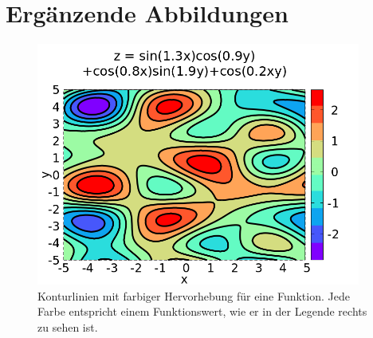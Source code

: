 \chapter{Ergänzende Abbildungen}

\begin{figure}[H]
    \label{fig:ContourComplexFun}
    \centering
    \includegraphics[width=0.95\textwidth]{./gnuplot/example-contour-field-complex}
    \caption{Konturlinien mit farbiger Hervorhebung für eine Funktion. Jede Farbe entspricht einem Funktionswert, wie er in der Legende rechts zu sehen ist.}
\end{figure}

